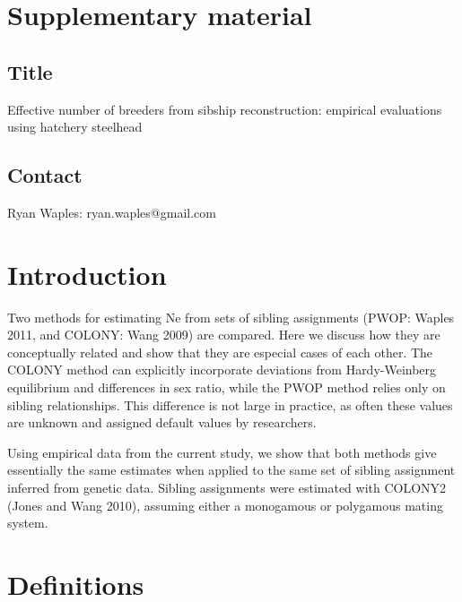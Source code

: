 \documentclass{article}
\begin{document}
\section*{Supplementary material}
\subsection*{Title}
Effective number of breeders from sibship reconstruction: empirical evaluations using hatchery steelhead

\subsection*{Contact}
Ryan Waples:   ryan.waples@gmail.com

\section*{Introduction}
Two methods for estimating Ne from sets of sibling assignments (PWOP: Waples 2011, and COLONY: Wang 2009) are compared.  Here we discuss how they are conceptually related and show that they are especial cases of each other.  The COLONY method can explicitly incorporate deviations from Hardy-Weinberg equilibrium and differences in sex ratio, while the PWOP method relies only on sibling relationships.  This difference is not large in practice, as often these values are unknown and assigned default values by researchers. 


Using empirical data from the current study, we show that both methods give essentially the same estimates when applied to the same set of sibling assignment inferred from genetic data.  Sibling assignments were estimated with COLONY2 (Jones and Wang 2010), assuming either a monogamous or polygamous mating system.


\section*{Definitions}
\end{document}
